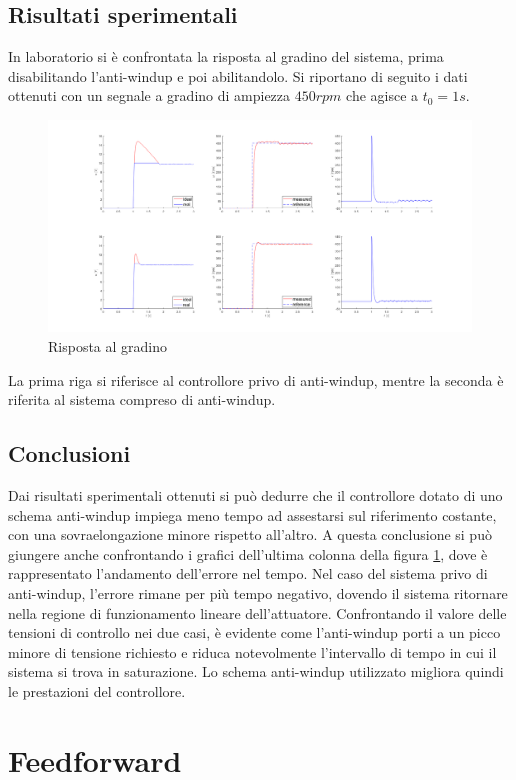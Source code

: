 \documentclass[a4paper, 11pt, Arial]{article}
\begin{document}
\subsection{Risultati sperimentali}
In laboratorio si è confrontata la risposta al gradino del sistema, prima disabilitando l'anti-windup e poi abilitandolo. Si riportano di seguito i dati ottenuti con un segnale a gradino di ampiezza $450rpm$ che agisce a $t_{0} = 1s$.
\begin{figure}[H]
    \centering
    \includegraphics[width=\linewidth]{Images/awu_resp.png}
    \caption{Risposta al gradino}
    \label{awu:step}
\end{figure}
La prima riga si riferisce al controllore privo di anti-windup, mentre la seconda è riferita al sistema compreso di anti-windup.

\subsection{Conclusioni}
Dai risultati sperimentali ottenuti si può dedurre che il controllore dotato di uno schema anti-windup impiega meno tempo ad assestarsi sul riferimento costante, con una sovraelongazione minore rispetto all'altro. A questa conclusione si può giungere anche confrontando i grafici dell'ultima colonna della figura \ref{awu:step}, dove è rappresentato l'andamento dell'errore nel tempo. Nel caso del sistema privo di anti-windup, l'errore rimane per più tempo negativo, dovendo il sistema ritornare nella regione di funzionamento lineare dell'attuatore. Confrontando il valore delle tensioni di controllo nei due casi, è evidente come l'anti-windup porti a un picco minore di tensione richiesto e riduca notevolmente l'intervallo di tempo in cui il sistema si trova in saturazione. Lo schema anti-windup utilizzato migliora quindi le prestazioni del controllore.

\section{Feedforward}

\end{document}
